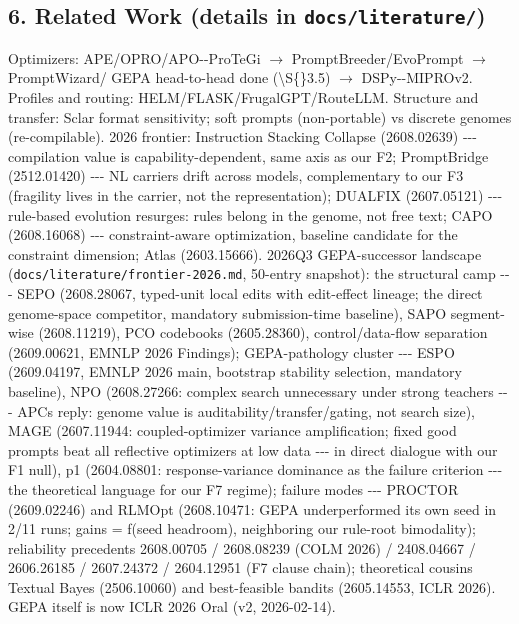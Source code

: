 \subsection{\texorpdfstring{6. Related Work (details in \texttt{docs/literature/})}{6. Related Work (details in docs/literature/)}}\label{6-related-work-details-in-docsliterature}

Optimizers: APE/OPRO/APO-\/-ProTeGi \(\rightarrow\) PromptBreeder/EvoPrompt \(\rightarrow\) PromptWizard/ GEPA head-to-head done (\textbackslash S\{\}3.5) \(\rightarrow\) DSPy-\/-MIPROv2. Profiles and routing: HELM/FLASK/FrugalGPT/RouteLLM. Structure and transfer: Sclar format sensitivity; soft prompts (non-portable) vs discrete genomes (re-compilable). 2026 frontier: Instruction Stacking Collapse (2608.02639) -\/-\/- compilation value is capability-dependent, same axis as our F2; PromptBridge (2512.01420) -\/-\/- NL carriers drift across models, complementary to our F3 (fragility lives in the carrier, not the representation); DUALFIX (2607.05121) -\/-\/- rule-based evolution resurges: rules belong in the genome, not free text; CAPO (2608.16068) -\/-\/- constraint-aware optimization, baseline candidate for the constraint dimension; Atlas (2603.15666). 2026Q3 GEPA-successor landscape (\texttt{docs/literature/frontier-2026.md}, 50-entry snapshot): the structural camp -\/-\/- SEPO (2608.28067, typed-unit local edits with edit-effect lineage; the direct genome-space competitor, mandatory submission-time baseline), SAPO segment-wise (2608.11219), PCO codebooks (2605.28360), control/data-flow separation (2609.00621, EMNLP 2026 Findings); GEPA-pathology cluster -\/-\/- ESPO (2609.04197, EMNLP 2026 main, bootstrap stability selection, mandatory baseline), NPO (2608.27266: complex search unnecessary under strong teachers -\/-\/- APC\textquotesingle s reply: genome value is auditability/transfer/gating, not search size), MAGE (2607.11944: coupled-optimizer variance amplification; fixed good prompts beat all reflective optimizers at low data -\/-\/- in direct dialogue with our F1 null), p1 (2604.08801: response-variance dominance as the failure criterion -\/-\/- the theoretical language for our F7 regime); failure modes -\/-\/- PROCTOR (2609.02246) and RLMOpt (2608.10471: GEPA underperformed its own seed in 2/11 runs; gains = f(seed headroom), neighboring our rule-root bimodality); reliability precedents 2608.00705 / 2608.08239 (COLM 2026) / 2408.04667 / 2606.26185 / 2607.24372 / 2604.12951 (F7 clause chain); theoretical cousins Textual Bayes (2506.10060) and best-feasible bandits (2605.14553, ICLR 2026). GEPA itself is now ICLR 2026 Oral (v2, 2026-02-14).


